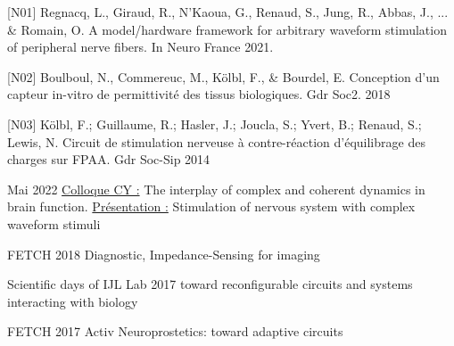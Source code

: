 \begin{cvskills}   
  \cvskill
    {[N01]} %
    {Regnacq, L., Giraud, R., N'Kaoua, G., Renaud, S., Jung, R., Abbas, J., ... \& Romain, O. A model/hardware framework for arbitrary waveform stimulation of peripheral nerve fibers. In Neuro France 2021. } %
\end{cvskills}
\begin{cvskills}   
  \cvskill
    {[N02]} %
    {Boulboul, N., Commereuc, M., Kölbl, F., \& Bourdel, E. Conception d’un capteur in-vitro de permittivité des tissus biologiques. Gdr Soc2. 2018} %
\end{cvskills}
\begin{cvskills}   
  \cvskill
    {[N03]} %
    {Kölbl, F.; Guillaume, R.; Hasler, J.; Joucla, S.; Yvert, B.; Renaud, S.; Lewis, N. Circuit de stimulation nerveuse à contre-réaction d’équilibrage des charges sur FPAA. Gdr Soc-Sip 2014} %
\end{cvskills}

\begin{cvskills}   
  \cvskill
     {Mai 2022} %
    {\underline{Colloque CY :} The interplay of complex and coherent dynamics in brain function. \underline{Présentation :} Stimulation of nervous system with complex waveform stimuli} %
\end{cvskills}
\begin{cvskills}   
  \cvskill
    {FETCH 2018} %
    {Diagnostic, Impedance-Sensing for imaging} %
\end{cvskills}
\begin{cvskills}   
  \cvskill
    {Scientific days of IJL Lab 2017} %
    { toward reconfigurable circuits and systems interacting with biology} %
\end{cvskills}
\begin{cvskills}   
  \cvskill
    {FETCH 2017} %
    { Activ Neuroprostetics: toward adaptive circuits} %
\end{cvskills}
